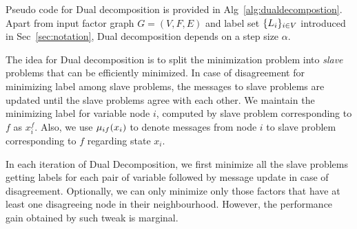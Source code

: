 \documentclass[letterpaper, 10 pt, conference]{ieeeconf} %
\begin{document}
Pseudo code for Dual decomposition is provided in
Alg~\ref{alg:dualdecompostion}. Apart from input factor graph $G = (V, F, E)$
and label set $\{L_i\}_{i \in V}$ introduced in Sec~\ref{sec:notation}, Dual
decomposition depends on a step size $\alpha$.

The idea for Dual decomposition is to split the minimization problem into
\emph{slave} problems that can be efficiently minimized. In case of
disagreement for minimizing label among slave problems, the messages to slave
problems are updated until the slave problems agree with each other. We
maintain the minimizing label for variable node $i$, computed by slave problem
corresponding to $f$ as $x^f_i$. Also, we use $\mu_{if}(x_i)$ to denote
messages from node $i$ to slave problem corresponding to $f$ regarding state
$x_i$.

In each iteration of Dual Decomposition, we first minimize all the slave
problems getting labels for each pair of variable followed by message update in
case of disagreement. Optionally, we can only minimize only those factors that
have at least one disagreeing node in their neighbourhood. However, the
performance gain obtained by such tweak is marginal.
\end{document}
